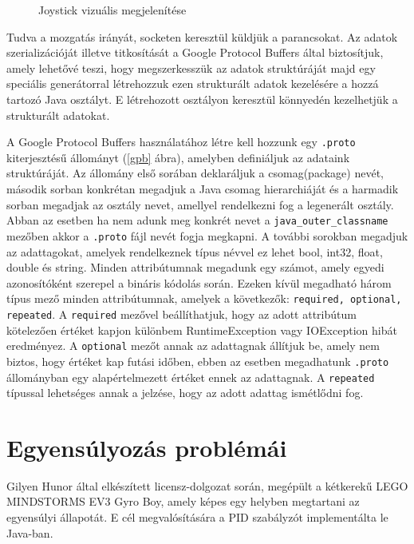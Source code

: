 \begin{figure}[!htb]
	\centering
	\caption{Joystick vizuális megjelenítése}
	\label{fig:joystick}
\end{figure}

Tudva a mozgatás irányát, socketen keresztül küldjük a parancsokat. Az adatok szerializációját illetve titkosítását a Google Protocol Buffers által biztosítjuk, amely lehetővé teszi, hogy megszerkesszük az adatok struktúráját majd egy speciális generátorral létrehozzuk ezen strukturált adatok kezelésére a hozzá tartozó Java osztályt. E létrehozott osztályon keresztül könnyedén kezelhetjük a strukturált adatokat.

A Google Protocol Buffers használatához létre kell hozzunk egy \texttt{.proto} kiterjesztésű állományt (\ref{gpb} ábra), amelyben definiáljuk az adataink struktúráját. Az állomány első sorában deklaráljuk a csomag(package) nevét, második sorban konkrétan megadjuk a Java csomag hierarchiáját és a harmadik sorban megadjak az osztály nevet, amellyel rendelkezni fog a legenerált osztály. Abban az esetben ha nem adunk meg konkrét nevet a \texttt{java\_outer\_classname} mezőben akkor a \texttt{.proto} fájl nevét fogja megkapni. A további sorokban megadjuk az adattagokat, amelyek rendelkeznek típus névvel ez lehet bool, int32, float, double és string. Minden attribútumnak megadunk egy számot, amely egyedi azonosítóként szerepel a bináris kódolás során. Ezeken kívül megadható három típus mező minden attribútumnak, amelyek a következők: \texttt{required, optional, repeated}. A \texttt{required} mezővel beállíthatjuk, hogy az adott attribútum kötelezően értéket kapjon különbem RuntimeException vagy IOException hibát eredményez.  A \texttt{optional} mezőt annak az adattagnak állítjuk be, amely nem biztos, hogy értéket kap futási időben, ebben az esetben megadhatunk \texttt{.proto} állományban egy alapértelmezett értéket ennek az adattagnak. A \texttt{repeated} típussal lehetséges annak a jelzése, hogy az adott adattag ismétlődni fog.



\section{Egyensúlyozás problémái}\label{sec:MEGVALOSITAS:pidModositas}

Gilyen Hunor által elkészített licensz-dolgozat során, megépült a kétkerekű LEGO MINDSTORMS EV3 Gyro Boy, amely képes egy helyben megtartani az egyensúlyi állapotát. E cél megvalósítására a PID szabályzót implementálta le Java-ban.


